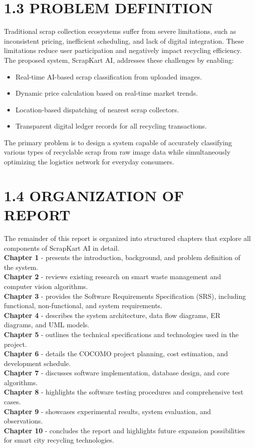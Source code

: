 \section{1.3 PROBLEM DEFINITION}
Traditional scrap collection ecosystems suffer from severe limitations, such as inconsistent pricing, inefficient scheduling, and lack of digital integration. These limitations reduce user participation and negatively impact recycling efficiency. The proposed system, ScrapKart AI, addresses these challenges by enabling:
\begin{itemize}
    \item Real-time AI-based scrap classification from uploaded images.
    \item Dynamic price calculation based on real-time market trends.
    \item Location-based dispatching of nearest scrap collectors.
    \item Transparent digital ledger records for all recycling transactions.
\end{itemize}
The primary problem is to design a system capable of accurately classifying various types of recyclable scrap from raw image data while simultaneously optimizing the logistics network for everyday consumers.

\section{1.4 ORGANIZATION OF REPORT}
The remainder of this report is organized into structured chapters that explore all components of ScrapKart AI in detail.\\
\textbf{Chapter 1} - presents the introduction, background, and problem definition of the system.\\
\textbf{Chapter 2} - reviews existing research on smart waste management and computer vision algorithms.\\
\textbf{Chapter 3} - provides the Software Requirements Specification (SRS), including functional, non-functional, and system requirements.\\
\textbf{Chapter 4} - describes the system architecture, data flow diagrams, ER diagrams, and UML models.\\
\textbf{Chapter 5} - outlines the technical specifications and technologies used in the project.\\
\textbf{Chapter 6} - details the COCOMO project planning, cost estimation, and development schedule.\\
\textbf{Chapter 7} - discusses software implementation, database design, and core algorithms.\\
\textbf{Chapter 8} - highlights the software testing procedures and comprehensive test cases.\\
\textbf{Chapter 9} - showcases experimental results, system evaluation, and observations.\\
\textbf{Chapter 10} - concludes the report and highlights future expansion possibilities for smart city recycling technologies.

